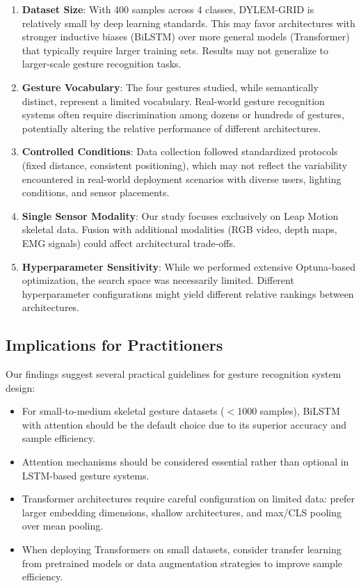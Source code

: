 \documentclass[conference]{IEEEtran}
\begin{document}
\begin{enumerate}
    \item \textbf{Dataset Size}: With 400 samples across 4 classes, DYLEM-GRID is relatively small by deep learning standards. This may favor architectures with stronger inductive biases (BiLSTM) over more general models (Transformer) that typically require larger training sets. Results may not generalize to larger-scale gesture recognition tasks.
    
    \item \textbf{Gesture Vocabulary}: The four gestures studied, while semantically distinct, represent a limited vocabulary. Real-world gesture recognition systems often require discrimination among dozens or hundreds of gestures, potentially altering the relative performance of different architectures.
    
    \item \textbf{Controlled Conditions}: Data collection followed standardized protocols (fixed distance, consistent positioning), which may not reflect the variability encountered in real-world deployment scenarios with diverse users, lighting conditions, and sensor placements.
    
    \item \textbf{Single Sensor Modality}: Our study focuses exclusively on Leap Motion skeletal data. Fusion with additional modalities (RGB video, depth maps, EMG signals) could affect architectural trade-offs.
    
    \item \textbf{Hyperparameter Sensitivity}: While we performed extensive Optuna-based optimization, the search space was necessarily limited. Different hyperparameter configurations might yield different relative rankings between architectures.
\end{enumerate}

\subsection{Implications for Practitioners}
Our findings suggest several practical guidelines for gesture recognition system design:

\begin{itemize}
    \item For small-to-medium skeletal gesture datasets ($<$1000 samples), BiLSTM with attention should be the default choice due to its superior accuracy and sample efficiency.
    \item Attention mechanisms should be considered essential rather than optional in LSTM-based gesture systems.
    \item Transformer architectures require careful configuration on limited data: prefer larger embedding dimensions, shallow architectures, and max/CLS pooling over mean pooling.
    \item When deploying Transformers on small datasets, consider transfer learning from pretrained models or data augmentation strategies to improve sample efficiency.
\end{itemize}
\end{document}
